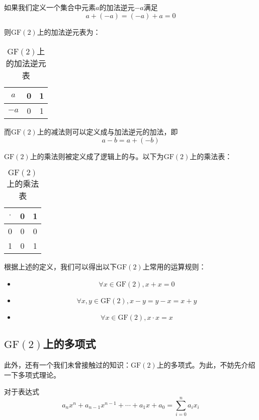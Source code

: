 \documentclass[UTF8]{ctexrep}
\def\pth#1{\left( {#1}\right)}
\def\GF{\mathrm{GF}}
\begin{document}
如果我们定义一个集合中元素$a$的加法逆元$-a$满足
\[a+\pth{-a}=\pth{-a}+a=0\]

则$\GF\pth{2}$上的加法逆元表为：
\begin{table}[H]
    \centering
    \caption{$\GF\pth{2}$上的加法逆元表}
    \begin{tabular}{c|cc}\hline
        $a$&0&1\\\hline
        $-a$&0&1\\\hline
    \end{tabular}
\end{table}

而$\GF\pth{2}$上的减法则可以定义成与加法逆元的加法，即
\begin{equation}
    a-b=a+\pth{-b}
\end{equation}

$\GF\pth{2}$上的乘法则被定义成了逻辑上的与。以下为$\GF\pth{2}$上的乘法表：
\begin{table}[H]
    \centering
    \caption{$\GF\pth{2}$上的乘法表}
    \begin{tabular}{c|cc}\hline
        $\cdot$&0&1\\\hline
        0&0&0\\
        1&0&1\\\hline
    \end{tabular}
\end{table}

根据上述的定义，我们可以得出以下$\GF\pth{2}$上常用的运算规则：
\begin{itemize}
    \item 
        \begin{equation}
            \forall x\in\GF\pth{2}, x+x=0
        \end{equation}
    \item 
        \begin{equation}
            \forall x, y\in\GF\pth{2}, x-y=y-x=x+y
        \end{equation}
    \item 
        \begin{equation}
            \forall x\in\GF\pth{2}, x\cdot x=x
        \end{equation}
\end{itemize}
\subsection{$\GF\pth{2}$上的多项式}
此外，还有一个我们未曾接触过的知识：$\GF\pth{2}$上的多项式。为此，不妨先介绍一下多项式理论。\par
对于表达式
\begin{equation}
    a_nx^n+a_{n-1}x^{n-1}+\cdots +a_1x+a_0=\sum_{i=0}^na_ix_i
\end{equation}
\end{document}
